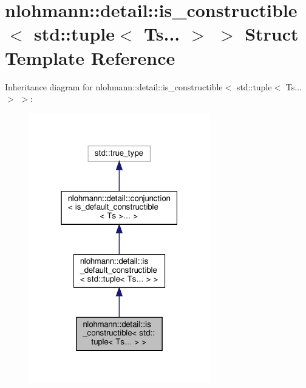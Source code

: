 \hypertarget{structnlohmann_1_1detail_1_1is__constructible_3_01std_1_1tuple_3_01Ts_8_8_8_01_4_01_4}{}\section{nlohmann\+:\+:detail\+:\+:is\+\_\+constructible$<$ std\+:\+:tuple$<$ Ts... $>$ $>$ Struct Template Reference}
\label{structnlohmann_1_1detail_1_1is__constructible_3_01std_1_1tuple_3_01Ts_8_8_8_01_4_01_4}


Inheritance diagram for nlohmann\+:\+:detail\+:\+:is\+\_\+constructible$<$ std\+:\+:tuple$<$ Ts... $>$ $>$\+:
\nopagebreak
\begin{figure}[H]
\begin{center}
\leavevmode
\includegraphics[width=223pt]{structnlohmann_1_1detail_1_1is__constructible_3_01std_1_1tuple_3_01Ts_8_8_8_01_4_01_4__inherit__graph}
\end{center}
\end{figure}



